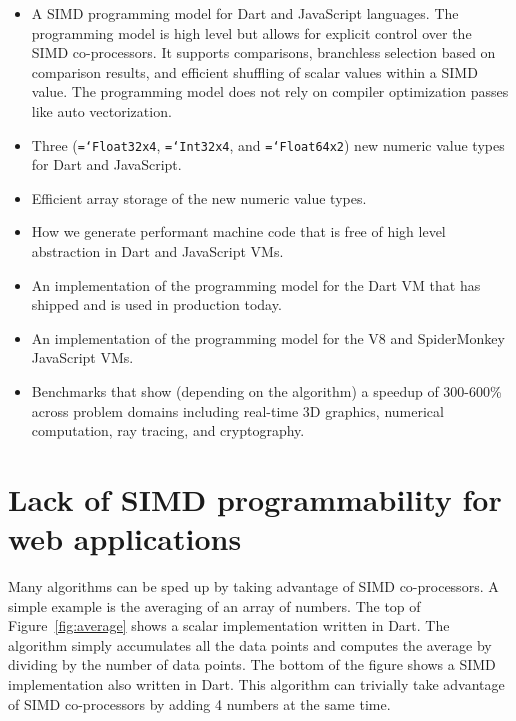 \documentclass[preprint]{sigplanconf}
\newcommand{\ttt}[1]{{\texttt{\hyphenchar\font=`\-\relax #1}}}%
\begin{document}
\begin{itemize}
\item
A SIMD programming model for Dart and JavaScript languages. The programming
model is high level but allows for explicit control over the SIMD co-processors.
It supports comparisons, branchless selection based on comparison results, and
efficient shuffling of scalar values within a SIMD value. The programming model
does not rely on compiler optimization passes like auto vectorization.

\item
Three (\ttt{Float32x4}, \ttt{Int32x4}, and \ttt{Float64x2}) new numeric value
types for Dart and JavaScript.

\item
Efficient array storage of the new numeric value types.

\item
How we generate performant machine code that is free of high level abstraction
in Dart and JavaScript VMs.

\item
An implementation of the programming model for the Dart VM that has shipped and
is used in production today.

\item
An implementation of the programming model for the V8 and SpiderMonkey
JavaScript VMs.

\item
Benchmarks that show (depending on the algorithm) a speedup of 300-600\% across
problem domains including real-time 3D graphics, numerical computation, ray
tracing, and cryptography.
\end{itemize}

\section{Lack of SIMD programmability for web applications}

Many algorithms can be sped up by taking advantage of SIMD co-processors. A
simple example is the averaging of an array of numbers. The top of
Figure~\ref{fig:average} shows a scalar implementation written in Dart. The
algorithm simply accumulates all the data points and computes the average by
dividing by the number of data points. The bottom of the figure shows a SIMD
implementation also written in Dart. This algorithm can trivially take advantage
of SIMD co-processors by adding 4 numbers at the same time.
\end{document}
